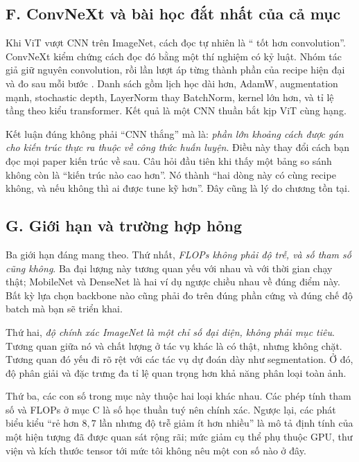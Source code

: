 \documentclass[../../../deep_learning.tex]{subfiles}
\begin{document}
\subsection{F. ConvNeXt và bài học đắt nhất của cả mục}
Khi ViT vượt CNN trên ImageNet, cách đọc tự nhiên là `` tốt hơn convolution''. ConvNeXt kiểm chứng cách đọc đó bằng một thí nghiệm có kỷ luật. Nhóm tác giả giữ nguyên convolution, rồi lần lượt áp từng thành phần của recipe hiện đại và đo sau mỗi bước \cite{liu2022convnext}. Danh sách gồm lịch học dài hơn, AdamW, augmentation mạnh, stochastic depth, LayerNorm thay BatchNorm, kernel lớn hơn, và tỉ lệ tầng theo kiểu transformer. Kết quả là một CNN thuần bắt kịp ViT cùng hạng.

Kết luận đúng không phải ``CNN thắng'' mà là: \emph{phần lớn khoảng cách được gán cho kiến trúc thực ra thuộc về công thức huấn luyện}. Điều này thay đổi cách bạn đọc mọi paper kiến trúc về sau. Câu hỏi đầu tiên khi thấy một bảng so sánh không còn là ``kiến trúc nào cao hơn''. Nó thành ``hai dòng này có cùng recipe không, và nếu không thì ai được tune kỹ hơn''. Đây cũng là lý do chương  tồn tại.

\subsection{G. Giới hạn và trường hợp hỏng}
Ba giới hạn đáng mang theo. Thứ nhất, \emph{FLOPs không phải độ trễ, và số tham số cũng không}. Ba đại lượng này tương quan yếu với nhau và với thời gian chạy thật; MobileNet và DenseNet là hai ví dụ ngược chiều nhau về đúng điểm này. Bất kỳ lựa chọn backbone nào cũng phải đo trên đúng phần cứng và đúng chế độ batch mà bạn sẽ triển khai.

Thứ hai, \emph{độ chính xác ImageNet là một chỉ số đại diện, không phải mục tiêu}. Tương quan giữa nó và chất lượng ở tác vụ khác là có thật, nhưng không chặt. Tương quan đó yếu đi rõ rệt với các tác vụ dự đoán dày như segmentation. Ở đó, độ phân giải và đặc trưng đa tỉ lệ quan trọng hơn khả năng phân loại toàn ảnh.

Thứ ba, các con số trong mục này thuộc hai loại khác nhau. Các phép tính tham số và FLOPs ở mục C là số học thuần tuý nên chính xác. Ngược lại, các phát biểu kiểu ``rẻ hơn \(8{,}7\) lần nhưng độ trễ giảm ít hơn nhiều'' là mô tả định tính của một hiện tượng đã được quan sát rộng rãi; mức giảm cụ thể phụ thuộc GPU, thư viện và kích thước tensor tới mức tôi không nêu một con số nào ở đây.
\end{document}

